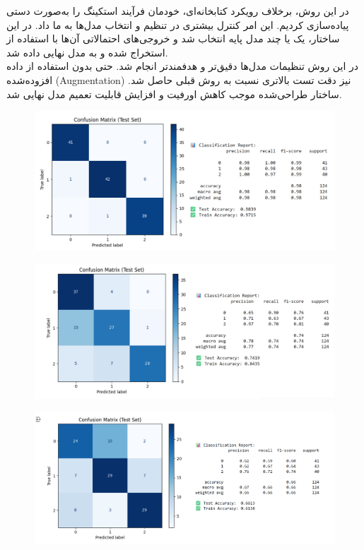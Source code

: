 \documentclass[a4paper,12pt]{article}
\begin{document}
در این روش، برخلاف رویکرد کتابخانه‌ای، خودمان فرآیند استکینگ را به‌صورت دستی پیاده‌سازی کردیم. این امر کنترل بیشتری در تنظیم و انتخاب مدل‌ها  به ما داد. در این ساختار، یک یا چند مدل پایه انتخاب شد و خروجی‌های احتمالاتی آن‌ها با استفاده از  استخراج شده و به مدل نهایی داده شد.
\\
در این روش تنظیمات مدل‌ها دقیق‌تر و هدفمندتر انجام شد.
حتی بدون استفاده از داده افزوده‌شده (Augmentation) نیز دقت تست بالاتری نسبت به روش قبلی حاصل شد.
ساختار طراحی‌شده موجب کاهش اورفیت و افزایش قابلیت تعمیم مدل نهایی شد.
\\
\begin{figure}[h]
	\centering
	\includegraphics[width=1\textwidth]{3-high.png}
\end{figure}
\FloatBarrier
\begin{figure}[h]
	\centering
	\includegraphics[width=1\textwidth]{3-mid.png}
\end{figure}
\FloatBarrier
\begin{figure}[h]
	\centering
	\includegraphics[width=1\textwidth]{3-low.png}
\end{figure}
\end{document}
